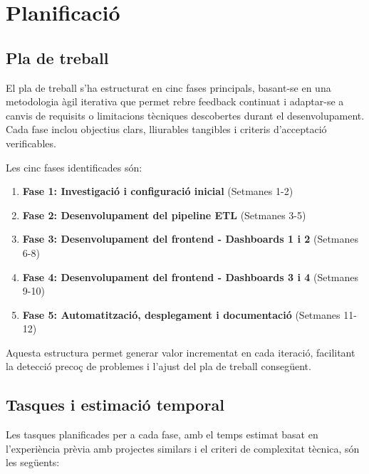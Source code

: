 

\chapter{Planificació}
\label{Ch:Planning}

\section{Pla de treball}

El pla de treball s'ha estructurat en cinc fases principals, basant-se en una metodologia àgil iterativa que permet rebre feedback continuat i adaptar-se a canvis de requisits o limitacions tècniques descobertes durant el desenvolupament. Cada fase inclou objectius clars, lliurables tangibles i criteris d'acceptació verificables.

Les cinc fases identificades són:
\begin{enumerate}
    \item \textbf{Fase 1: Investigació i configuració inicial} (Setmanes 1-2)
    \item \textbf{Fase 2: Desenvolupament del pipeline ETL} (Setmanes 3-5)
    \item \textbf{Fase 3: Desenvolupament del frontend - Dashboards 1 i 2} (Setmanes 6-8)
    \item \textbf{Fase 4: Desenvolupament del frontend - Dashboards 3 i 4} (Setmanes 9-10)
    \item \textbf{Fase 5: Automatització, desplegament i documentació} (Setmanes 11-12)
\end{enumerate}

Aquesta estructura permet generar valor incrementat en cada iteració, facilitant la detecció precoç de problemes i l'ajust del pla de treball consegüent.

\section{Tasques i estimació temporal}

Les tasques planificades per a cada fase, amb el temps estimat basat en l'experiència prèvia amb projectes similars i el criteri de complexitat tècnica, són les següents:

